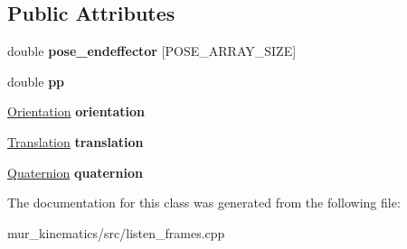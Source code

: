 \subsection*{Public Attributes}
\begin{DoxyCompactItemize}
\item 
\mbox{\label{classListenFrames_a19a5004b84bfd9956d292700ddb316cf}} 
double {\bfseries pose\+\_\+endeffector} \mbox{[}P\+O\+S\+E\+\_\+\+A\+R\+R\+A\+Y\+\_\+\+S\+I\+ZE\mbox{]}
\item 
\mbox{\label{classListenFrames_ac53f0f922d4afaa280aa0095bcbe0d3f}} 
double {\bfseries pp}
\item 
\mbox{\label{classListenFrames_a3bc61a57c7dec9d8aea5287358dcacef}} 
\hyperlink{structOrientation}{Orientation} {\bfseries orientation}
\item 
\mbox{\label{classListenFrames_a6deeb6697d3c32c05243bb987c1e9c5f}} 
\hyperlink{structTranslation}{Translation} {\bfseries translation}
\item 
\mbox{\label{classListenFrames_a0ceb155e09d7d28fcce7c825bc10f99c}} 
\hyperlink{structQuaternion}{Quaternion} {\bfseries quaternion}
\end{DoxyCompactItemize}


The documentation for this class was generated from the following file\+:\begin{DoxyCompactItemize}
\item 
mur\+\_\+kinematics/src/listen\+\_\+frames.\+cpp\end{DoxyCompactItemize}
